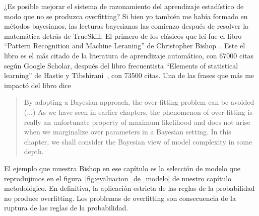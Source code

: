 \documentclass[a4paper,11pt]{book}
\theoremstyle{definition}
\begin{document}

¿Es posible mejorar el sistema de razonamiento del aprendizaje estadístico de modo que no se produzca overfitting?
%
Si bien yo también me había formado en métodos bayesianos, las lecturas bayesianas las comienzo después de resolver la matemática detrás de TrueSkill.
%
El primero de los clásicos que leí fue el libro ``Pattern Recognition and Machine Leraning'' de Christopher Bishop~\cite{Bishop2006}.
%
Este el libro es el más citado de la literatura de aprendizaje automático, con 67000 citas según Google Scholar, después del libro frecuentista ``Elements of statistical learning'' de Hastie y Tibshirani~\cite{hastie2009-elements}, con 73500 citas.
%
Una de las frases que más me impactó del libro dice
%
\begin{quotation}
By adopting a Bayesian approach, the over-fitting problem can be avoided (...) As we have seen in earlier chapters, the phenomenon of over-fitting is really an unfortunate property of maximum likelihood and does not arise when we marginalize over parameters in a Bayesian setting. In this chapter, we shall consider the Bayesian view of model complexity in some depth.
\end{quotation}
%
El ejemplo que muestra Bishop en ese capítulo es la selección de modelo que reprodujimos en el figura~\ref{fig:evaluacion_de_modelo} de nuestro capítulo metodológico.
%
En definitiva, la aplicación estricta de las reglas de la probabilidad no produce overfitting.
%
Los problemas de overfitting son consecuencia de la ruptura de las reglas de la probabilidad.

\end{document}
